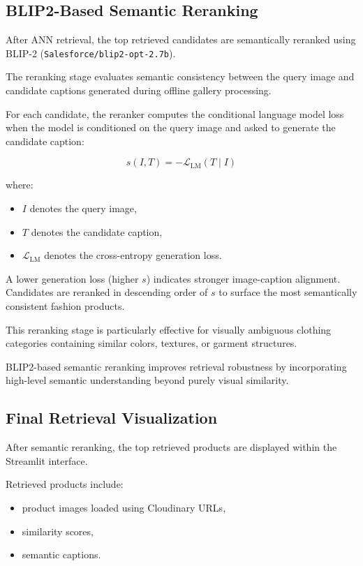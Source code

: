 \documentclass[11pt,a4paper]{article}
\begin{document}
\subsection{BLIP2-Based Semantic Reranking}

After ANN retrieval, the top retrieved candidates are semantically reranked using BLIP-2 (\texttt{Salesforce/blip2-opt-2.7b}).

The reranking stage evaluates semantic consistency between the query image and candidate captions generated during offline gallery processing.

For each candidate, the reranker computes the conditional language model loss when the model is conditioned on the query image and asked to generate the candidate caption:

\begin{equation}
s(I, T) = -\mathcal{L}_{\text{LM}}(T \mid I)
\end{equation}

where:
\begin{itemize}
    \item $I$ denotes the query image,
    \item $T$ denotes the candidate caption,
    \item $\mathcal{L}_{\text{LM}}$ denotes the cross-entropy generation loss.
\end{itemize}

A lower generation loss (higher $s$) indicates stronger image-caption alignment. Candidates are reranked in descending order of $s$ to surface the most semantically consistent fashion products.

This reranking stage is particularly effective for visually ambiguous clothing categories containing similar colors, textures, or garment structures.

BLIP2-based semantic reranking improves retrieval robustness by incorporating high-level semantic understanding beyond purely visual similarity.

\subsection{Final Retrieval Visualization}

After semantic reranking, the top retrieved products are displayed within the Streamlit interface.

Retrieved products include:
\begin{itemize}
    \item product images loaded using Cloudinary URLs,
    \item similarity scores,
    \item semantic captions.
\end{itemize}
\end{document}
